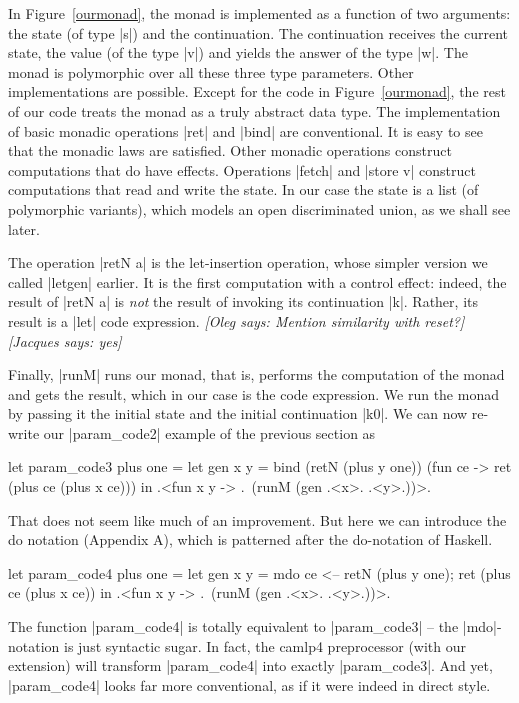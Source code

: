 \documentclass{llncs}
\newcommand{\oleg}[1]{{\it [Oleg says: #1]}}
\newcommand{\jacques}[1]{{\it [Jacques says: #1]}}
\begin{document}
In Figure~\ref{ourmonad}, the monad is implemented as a function of two
arguments: the state (of type |s|) and the continuation. The
continuation receives the current state, the value (of the type |v|) and
yields the answer of the type |w|.  The monad is polymorphic over all
these three type parameters.  Other implementations are
possible. Except for the code in Figure~\ref{ourmonad}, the rest of our code
treats the monad as a truly abstract data type. The implementation of basic
monadic operations |ret| and |bind| are conventional. It is easy to
see that the monadic laws are satisfied.  Other monadic operations
construct computations that do have effects.  Operations |fetch| and
|store v| construct computations that read and write the state. In our
case the state is a list (of polymorphic variants), which models an
open discriminated union, as we shall see later.

The operation |retN a| is the let-insertion operation, whose simpler
version we called |letgen| earlier. It is the first computation with
a control effect: indeed, the result of |retN a| is \emph{not} the
result of invoking its continuation |k|. Rather, its result is a |let|
code expression. \oleg{Mention similarity with reset?}
\jacques{yes}

Finally, |runM| runs our monad, that is, performs the computation of
the monad and gets the result, which in our case is the code
expression. We run the monad by passing it the initial state and the
initial continuation |k0|. We can now re-write our |param_code2|
example of the previous section as

\begin{code}
let param_code3 plus one =
  let gen x y = bind (retN (plus y one)) (fun ce -> 
                ret (plus ce (plus x ce)))
  in .<fun x y -> .~(runM (gen .<x>. .<y>.))>.
\end{code}

That does not seem like much of an improvement. But here we can introduce the
do notation (Appendix A), which is patterned after the do-notation of Haskell.

\begin{code}
let param_code4 plus one =
  let gen x y = mdo { ce <-- retN (plus y one);
                      ret (plus ce (plus x ce)) }
  in .<fun x y -> .~(runM (gen .<x>. .<y>.))>.
\end{code}

The function |param_code4| is totally equivalent to |param_code3| --
the |mdo|-notation is just syntactic sugar. In fact, the camlp4
preprocessor (with our extension) will transform |param_code4|
into exactly |param_code3|. And yet, |param_code4| looks far more
conventional, as if it were indeed in direct style.
\end{document}
